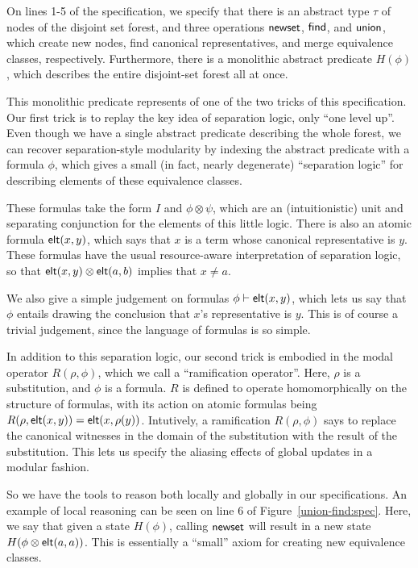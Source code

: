 On lines 1-5 of the specification, we specify that there is an
abstract type $\tau$ of nodes of the disjoint set forest, and three
operations $\mathsf{newset}$, $\mathsf{find}$, and $\mathsf{union}$, which create new nodes,
find canonical representatives, and merge equivalence classes,
respectively. Furthermore, there is a monolithic abstract predicate
$H(\phi)$, which describes the entire disjoint-set forest all at once.

This monolithic predicate represents of one of the two tricks of this
specification. Our first trick is to replay the key idea of separation
logic, only ``one level up''. Even though we have a single abstract
predicate describing the whole forest, we can recover separation-style
modularity by indexing the abstract predicate with a formula $\phi$,
which gives a small (in fact, nearly degenerate) ``separation logic''
for describing elements of these equivalence classes.

These formulas take the form $I$ and $\phi \otimes \psi$, which are an
(intuitionistic) unit and separating conjunction for the elements of
this little logic. There is also an atomic formula $\mathsf{elt}({x}, {y})$, which
says that $x$ is a term whose canonical representative is $y$. These
formulas have the usual resource-aware interpretation of separation
logic, so that $\mathsf{elt}({x}, {y}) \otimes \mathsf{elt}({a}, {b})$ implies that $x \not=
a$. %

We also give a simple judgement on formulas ${\phi} \vdash \mathsf{elt}({x}, {y})$,
which lets us say that $\phi$ entails drawing the conclusion that
$x$'s representative is $y$. This is of course a trivial judgement,
since the language of formulas is so simple.

In addition to this separation logic, our second trick is embodied in
the modal operator $R(\rho, \phi)$, which we call a ``ramification
operator''. Here, $\rho$ is a substitution, and $\phi$ is a
formula. $R$ is defined to operate homomorphically on the structure of
formulas, with its action on atomic formulas being $R(\rho,
\mathsf{elt}({x}, {y})) = \mathsf{elt}({x}, {\rho(y)})$. Intutively, a ramification $R(\rho,
\phi)$ says to replace the canonical witnesses in the domain of the
substitution with the result of the substitution. This lets us specify
the aliasing effects of global updates in a modular fashion.

So we have the tools to reason both locally and globally in our
specifications.  An example of local reasoning can be seen on line 6
of Figure~\ref{union-find:spec}.  Here, we say that given a state
$H(\phi)$, calling $\mathsf{newset}$ will result in a new state $H(\phi
\otimes \mathsf{elt}({a}, {a}))$. This is essentially a ``small'' axiom for
creating new equivalence classes. 

